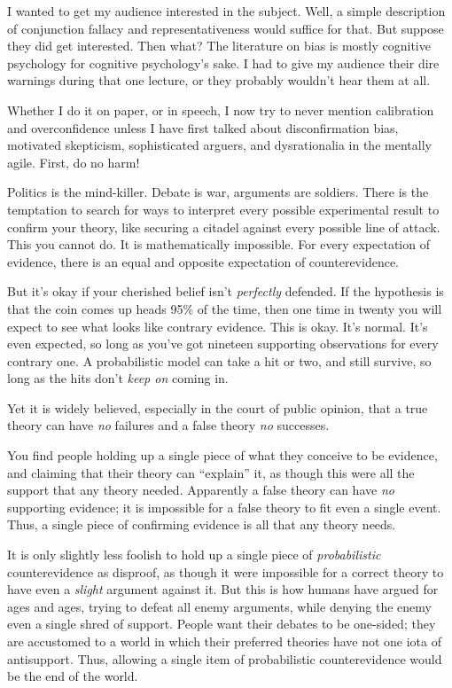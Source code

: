 {
 I wanted to get my audience interested in the subject. Well, a
simple description of conjunction fallacy and representativeness would
suffice for that. But suppose they did get interested. Then what? The
literature on bias is mostly cognitive psychology for cognitive
psychology's sake. I had to give my audience their dire
warnings during that one lecture, or they probably
wouldn't hear them at all.}

{
 Whether I do it on paper, or in speech, I now try to never mention
calibration and overconfidence unless I have first talked about
disconfirmation bias, motivated skepticism, sophisticated arguers, and
dysrationalia in the mentally agile. First, do no harm!}

\myendsectiontext


\bigskip


{
 Politics is the mind-killer. Debate is war, arguments are
soldiers. There is the temptation to search for ways to interpret every
possible experimental result to confirm your theory, like securing a
citadel against every possible line of attack. This you cannot do. It
is mathematically impossible. For every expectation of evidence, there
is an equal and opposite expectation of counterevidence. }

{
 But it's okay if your cherished belief
isn't \textit{perfectly} defended. If the hypothesis is
that the coin comes up heads 95\% of the time, then one time in twenty
you will expect to see what looks like contrary evidence. This is okay.
It's normal. It's even expected, so
long as you've got nineteen supporting observations for
every contrary one. A probabilistic model can take a hit or two, and
still survive, so long as the hits don't \textit{keep
on} coming in.}

{
 Yet it is widely believed, especially in the court of public
opinion, that a true theory can have \textit{no} failures and a false
theory \textit{no} successes.}

{
 You find people holding up a single piece of what they conceive to
be evidence, and claiming that their theory can
``explain'' it, as though this were
all the support that any theory needed. Apparently a false theory can
have \textit{no} supporting evidence; it is impossible for a false
theory to fit even a single event. Thus, a single piece of confirming
evidence is all that any theory needs.}

{
 It is only slightly less foolish to hold up a single piece of
\textit{probabilistic} counterevidence as disproof, as though it were
impossible for a correct theory to have even a \textit{slight} argument
against it. But this is how humans have argued for ages and ages,
trying to defeat all enemy arguments, while denying the enemy even a
single shred of support. People want their debates to be one-sided;
they are accustomed to a world in which their preferred theories have
not one iota of antisupport. Thus, allowing a single item of
probabilistic counterevidence would be the end of the world.}


